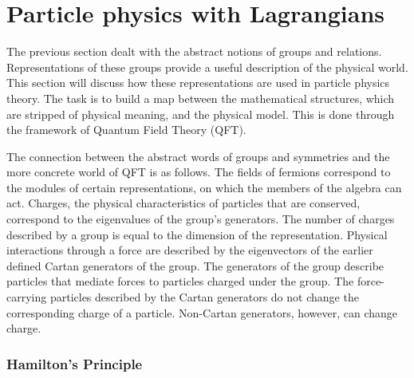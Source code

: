 \section{Particle physics with Lagrangians}\label{sec:lagrangians}

The previous section dealt with the abstract notions of groups and relations.
Representations of these groups provide a useful description of the physical world.
This section will discuss how these representations are used in particle physics theory.
The task is to build a map between the mathematical structures, which are stripped of physical meaning, and the physical model.
This is done through the framework of Quantum Field Theory (QFT).

The connection between the abstract words of groups and symmetries and the more concrete world of QFT is as follows.
The fields of fermions correspond to the modules of certain representations, on which the members of the algebra can act.
Charges, the physical characteristics of particles that are conserved, correspond to the eigenvalues of the group's generators.
The number of charges described by a group is equal to the dimension of the representation.
Physical interactions through a force are described by the eigenvectors of the earlier defined Cartan generators of the group.
The generators of the group describe particles that mediate forces to particles charged under the group.
The force-carrying particles described by the Cartan generators do not change the corresponding charge of a particle.
Non-Cartan generators, however, can change charge.

\subsubsection{Hamilton's Principle}\label{sec:lagrangian}

